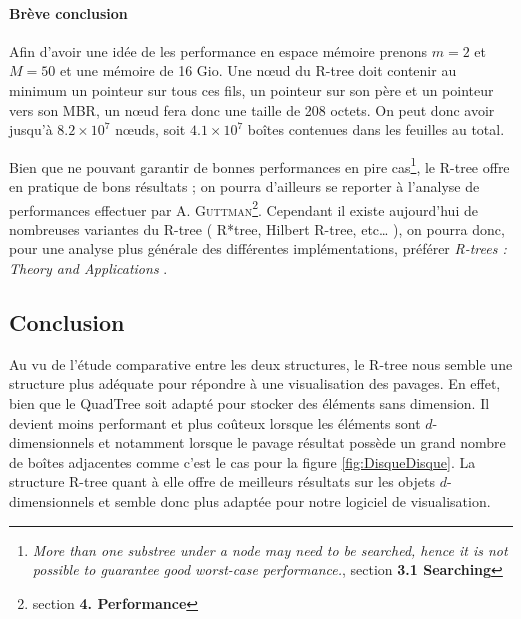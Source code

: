 \paragraph{Brève conclusion} Afin d'avoir une idée de les performance en espace mémoire prenons $m=2$ et $M=50$ et une mémoire de 16 Gio. Une nœud du R-tree doit contenir au minimum un pointeur sur tous ces fils, un pointeur sur son père et un pointeur vers son MBR, un nœud fera donc une taille de 208 octets. On peut donc avoir jusqu'à $8.2 \times 10^7$ nœuds, soit $4.1 \times 10^7$ boîtes contenues dans les feuilles au total.   

 Bien que ne pouvant garantir de bonnes performances en pire cas\footnote{\og \emph{More than one substree under a node may need to be searched, hence it is not possible to guarantee good worst-case performance.}\fg{}\cite{Guttman}, section \textbf{3.1 Searching}}, le R-tree offre en pratique de bons résultats ; on pourra d'ailleurs se reporter à l'analyse de performances effectuer par A. \textsc{Guttman}\footnote{section \textbf{4. Performance}\cite{Guttman}}. Cependant il existe aujourd'hui de nombreuses variantes du R-tree ( R*tree, Hilbert R-tree, etc\dots{} ), on pourra donc, pour une analyse plus générale des différentes implémentations, préférer \emph{R-trees : Theory and Applications} \cite{poulos}.

\subsection{Conclusion}
Au vu de l'étude comparative entre les deux structures, le R-tree nous semble une structure plus adéquate pour répondre à une visualisation des pavages. En effet, bien que le QuadTree soit adapté pour stocker des éléments sans dimension. Il devient moins performant et plus coûteux lorsque les éléments sont $d$-dimensionnels et notamment lorsque le pavage résultat possède un grand nombre de boîtes adjacentes comme c'est le cas pour la figure \ref{fig:DisqueDisque}. La structure R-tree quant à elle offre de meilleurs résultats sur les objets $d$-dimensionnels et semble donc plus adaptée pour notre logiciel de visualisation.
